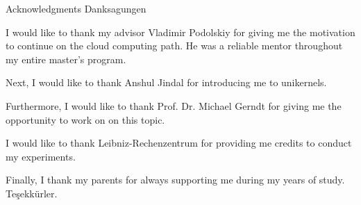 \makeatletter
{}
{}
{}
\makeatother
\thispagestyle{empty}

\vspace*{20mm}

\begin{center}
\makeatletter
{}
{ Acknowledgments}
{ Danksagungen}
\makeatother
\end{center}

\vspace{10mm}

I would like to thank my advisor Vladimir Podolskiy for giving me the motivation to continue on the cloud computing path. He was a reliable mentor throughout my entire master's program.

Next, I would like to thank Anshul Jindal for introducing me to unikernels.

Furthermore, I would like to thank Prof. Dr. Michael Gerndt for giving me the opportunity to work on on this topic.

I would like to thank Leibniz-Rechenzentrum for providing me credits to conduct my experiments.

Finally, I thank my parents for always supporting me during my years of study. Teşekkürler.

\cleardoublepage{}
